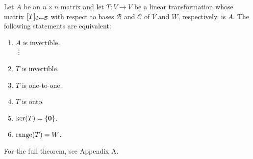 \documentclass[../m73main.tex]{subfiles}
\begin{document}
\begin{theorem}
	Let $A$ be an $n\times n$ matrix and let $T : V \to V$ be a linear transformation whose matrix $[T]_{\mathcal{C} \leftarrow \mathcal{B}}$ with respect to bases $\mathcal{B}$ and $\mathcal{C}$ of $V$ and $W$, respectively, is $A$.
	The following statements are equivalent:
	\begin{enumerate}[label=(\alph*)]
		\item $A$ is invertible. \\
		\phantom{~}\hspace{-19.5pt} \vdots
		\setcounter{enumi}{15}
		\item $T$ is invertible.
		\item $T$ is one-to-one.
		\item $T$ is onto.
		\item $\textrm{ker}(T) = \{\mathbf{0}\}$.
		\item $\textrm{range}(T) = W$.
	\end{enumerate}
	For the full theorem, see Appendix A.
\end{theorem}
\end{document}
